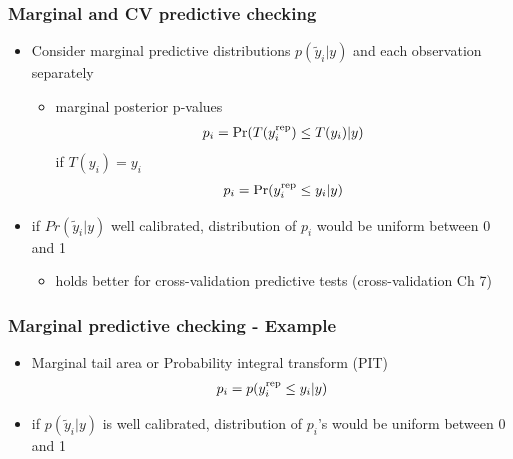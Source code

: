 \documentclass[10pt,handout]{beamer}
\begin{document}

\begin{frame}[fragile]

\frametitle{Marginal and CV predictive checking}

  \begin{itemize}
  \item Consider marginal predictive distributions $p(\tilde{y}_i|y)$
    and each observation separately
    \begin{itemize}
    \item marginal posterior p-values
      \begin{align*}
        p_i = \mbox{Pr}(T(y_i^{\operatorname{\mathrm{rep}}}) \leq T(y_i) | y)
      \end{align*}
      if $T(y_i)=y_i$
      \begin{align*}
        p_i = \mbox{Pr}(y_i^{\operatorname{\mathrm{rep}}} \leq y_i | y)
      \end{align*}
    \end{itemize}
  \item<2-> if $Pr(\tilde{y}_i|y)$ well calibrated, distribution of $p_i$
    would be uniform between 0 and 1
    \begin{itemize}
    \item holds better for cross-validation predictive tests
      (cross-validation Ch 7)
    \end{itemize}
  \end{itemize}

\end{frame}

\begin{frame}[fragile]

\frametitle{Marginal predictive checking - Example}

  \begin{itemize}
  \item Marginal tail area or Probability integral transform (PIT)
    \begin{align*}
      p_i = p(y_i^{\operatorname{\mathrm{rep}}} \leq y_i | y)
    \end{align*}
  \item if $p(\tilde{y}_i|y)$ is well calibrated, distribution of $p_i$'s
    would be uniform between 0 and 1
  \end{itemize}
  \vspace{-1.5\baselineskip}

\end{frame}
\end{document}
